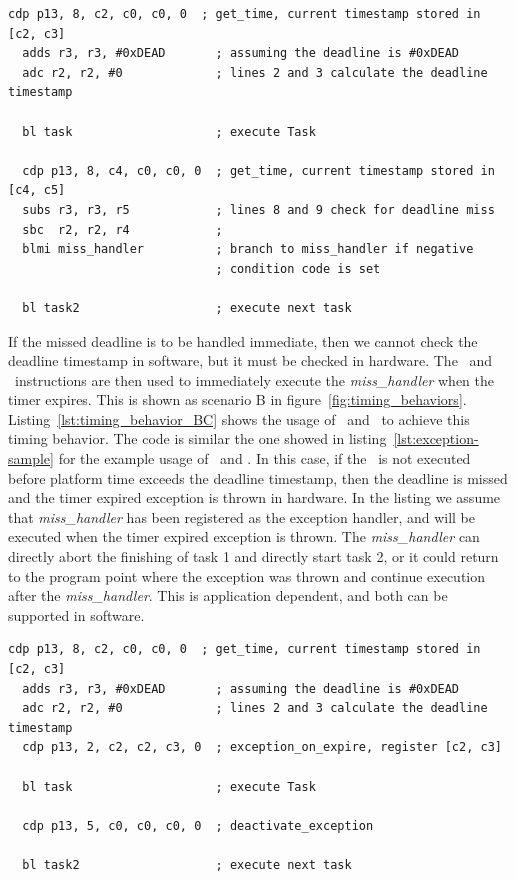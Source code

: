 \begin{lstlisting}[float=h, label=lst:timing_behavior_A,caption=Assembly code to implement scenario A]
  cdp p13, 8, c2, c0, c0, 0  ; get_time, current timestamp stored in [c2, c3]
  adds r3, r3, #0xDEAD       ; assuming the deadline is #0xDEAD
  adc r2, r2, #0             ; lines 2 and 3 calculate the deadline timestamp
   
  bl task                    ; execute Task
  
  cdp p13, 8, c4, c0, c0, 0  ; get_time, current timestamp stored in [c4, c5]
  subs r3, r3, r5            ; lines 8 and 9 check for deadline miss
  sbc  r2, r2, r4            ; 
  blmi miss_handler          ; branch to miss_handler if negative 
                             ; condition code is set
     
  bl task2                   ; execute next task
\end{lstlisting}

If the missed deadline is to be handled immediate, then we cannot check the deadline timestamp in software, but it must be checked in hardware.  
The \exceptiononexpire\ and \deactivateexception\ instructions are then used to immediately execute the \emph{miss\_handler} when the timer expires.
This is shown as scenario B in figure~\ref{fig:timing_behaviors}.
Listing~\ref{lst:timing_behavior_BC} shows the usage of \exceptiononexpire\ and \deactivateexception\ to achieve this timing behavior.
The code is similar the one showed in listing~\ref{lst:exception-sample} for the example usage of \exceptiononexpire\ and \deactivateexception.
In this case, if the \deactivateexception\ is not executed before platform time exceeds the deadline timestamp, then the deadline is missed and the timer expired exception is thrown in hardware.
In the listing we assume that \emph{miss\_handler} has been registered as the exception handler, and will be executed when the timer expired exception is thrown.
The \emph{miss\_handler} can directly abort the finishing of task 1 and directly start task 2, or it could return to the program point where the exception was thrown and continue execution after the \emph{miss\_handler}. 
This is application dependent, and both can be supported in software.   

\begin{lstlisting}[float=h, label=lst:timing_behavior_BC,caption=Assembly code to implement scenario B and C]
  cdp p13, 8, c2, c0, c0, 0  ; get_time, current timestamp stored in [c2, c3]
  adds r3, r3, #0xDEAD       ; assuming the deadline is #0xDEAD
  adc r2, r2, #0             ; lines 2 and 3 calculate the deadline timestamp
  cdp p13, 2, c2, c2, c3, 0  ; exception_on_expire, register [c2, c3]
   
  bl task                    ; execute Task
  
  cdp p13, 5, c0, c0, c0, 0  ; deactivate_exception
     
  bl task2                   ; execute next task
\end{lstlisting}

